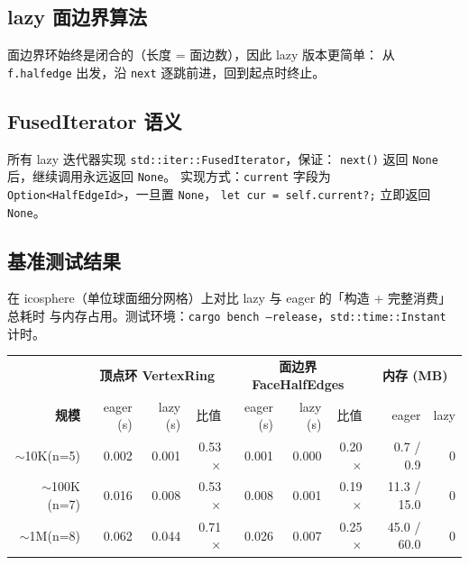\documentclass[11pt,a4paper]{article}
\begin{document}
\subsection{lazy 面边界算法}

面边界环始终是闭合的（长度 = 面边数），因此 lazy 版本更简单：
从 \texttt{f.halfedge} 出发，沿 \texttt{next} 逐跳前进，回到起点时终止。

\subsection{FusedIterator 语义}

所有 lazy 迭代器实现 \texttt{std::iter::FusedIterator}，保证：
\texttt{next()} 返回 \texttt{None} 后，继续调用永远返回 \texttt{None}。
实现方式：\texttt{current} 字段为 \texttt{Option<HalfEdgeId>}，一旦置 \texttt{None}，
\texttt{let cur = self.current?;} 立即返回 \texttt{None}。

\subsection{基准测试结果}

在 icosphere（单位球面细分网格）上对比 lazy 与 eager 的「构造 + 完整消费」总耗时
与内存占用。测试环境：\texttt{cargo bench --release}，\texttt{std::time::Instant} 计时。

\begin{center}
\scriptsize
\renewcommand{\arraystretch}{1.20}
\begin{tabular}{@{}r|rrr|rrr|rr@{}}
  \toprule
   & \multicolumn{3}{c|}{\textbf{顶点环 VertexRing}} & \multicolumn{3}{c|}{\textbf{面边界 FaceHalfEdges}} & \multicolumn{2}{c}{\textbf{内存 (MB)}} \\
  \textbf{规模} & eager (s) & lazy (s) & 比值 & eager (s) & lazy (s) & 比值 & eager & lazy \\
  \midrule
  $\sim$10K\;(n=5)  & 0.002 & 0.001 & 0.53$\times$ & 0.001 & 0.000 & 0.20$\times$ & 0.7 / 0.9 & 0 \\
  $\sim$100K (n=7)  & 0.016 & 0.008 & 0.53$\times$ & 0.008 & 0.001 & 0.19$\times$ & 11.3 / 15.0 & 0 \\
  $\sim$1M\;(n=8)   & 0.062 & 0.044 & 0.71$\times$ & 0.026 & 0.007 & 0.25$\times$ & 45.0 / 60.0 & 0 \\
  \bottomrule
\end{tabular}
\end{center}
\end{document}
